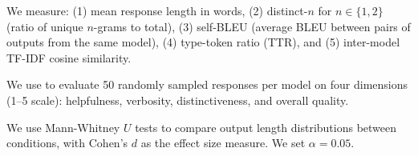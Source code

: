  We measure: (1) mean response length in words, (2) distinct-$n$ for $n \in \{1, 2\}$ (ratio of unique $n$-grams to total), (3) self-BLEU (average BLEU between pairs of outputs from the same model), (4) type-token ratio (TTR), and (5) inter-model TF-IDF cosine similarity.

 We use \gptjudge to evaluate 50 randomly sampled responses per model on four dimensions (1--5 scale): helpfulness, verbosity, distinctiveness, and overall quality.

 We use Mann-Whitney $U$ tests to compare output length distributions between conditions, with Cohen's $d$ as the effect size measure. We set $\alpha = 0.05$.
